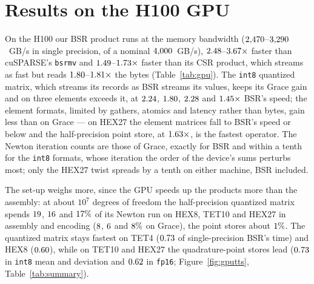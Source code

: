 \documentclass[sigconf,review]{acmart}
\begin{document}
\section{Results on the H100 GPU}
\label{sec:gpu}

On the H100 our BSR product runs at the memory bandwidth
($2{,}470$--$3{,}290$~GB/s in single precision, of a nominal
$4{,}000$~GB/s),
$2.48$--$3.67\times$ faster than
cuSPARSE's \texttt{bsrmv} and $1.49$--$1.73\times$ faster than
its CSR product, which streams as fast but reads
$1.80$--$1.81\times$ the bytes
(Table~\ref{tab:gpu}).  The \texttt{int8} quantized matrix, which streams its records as BSR streams
its values, keeps its Grace gain and on three elements exceeds it, at $2.24$,
$1.80$, $2.28$ and
$1.45\times$ BSR's speed; the element formats, limited by gathers,
atomics and latency rather than bytes, gain less than on Grace --- on HEX27 the element matrices fall
to BSR's speed or below and the half-precision point store, at
$1.63\times$, is the fastest operator.  The Newton iteration counts
are those of Grace, exactly for BSR and within a tenth for the \texttt{int8} formats, whose iteration
the order of the device's sums perturbs most; only the HEX27 twist spreads by a tenth on either
machine, BSR included.

The set-up weighs more, since the GPU speeds up the products more than the assembly: at about $10^7$
degrees of freedom the half-precision quantized matrix spends $19$,
$16$ and $17\%$ of its Newton run on
HEX8, TET10 and HEX27 in assembly and encoding ($8$,
$6$ and $8\%$ on Grace), the point stores
about $1\%$.  The quantized matrix stays fastest on TET4
($0.73$ of single-precision BSR's time) and HEX8 ($0.60$),
while on TET10 and HEX27 the quadrature-point stores lead ($0.73$ in
\texttt{int8} mean and deviation and $0.62$ in \texttt{fp16};
Figure~\ref{fig:gputts}, Table~\ref{tab:summary}).
\end{document}
